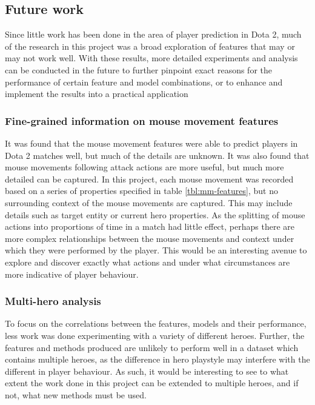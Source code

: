 \documentclass[Report.tex]{subfiles}
\begin{document}



\subsection{Future work}
Since little work has been done in the area of player prediction in Dota 2, much of the research in this project was a broad exploration of features that may or may not work well. With these results, more detailed experiments and analysis can be conducted in the future to further pinpoint exact reasons for the performance of certain feature and model combinations, or to enhance and implement the results into a practical application

\subsubsection{Fine-grained information on mouse movement features}
It was found that the mouse movement features were able to predict players in Dota 2 matches well, but much of the details are unknown. It was also found that mouse movements following attack actions are more useful, but much more detailed can be captured. In this project, each mouse movement was recorded based on a series of properties specified in table \ref{tbl:mm-features}, but no surrounding context of the mouse movements are captured. This may include details such as target entity or current hero properties. As the splitting of mouse actions into proportions of time in a match had little effect, perhaps there are more complex relationships between the mouse movements and context under which they were performed by the player. This would be an interesting avenue to explore and discover exactly what actions and under what circumstances are more indicative of player behaviour. 

\subsubsection{Multi-hero analysis}
To focus on the correlations between the features, models and their performance, less work was done experimenting with a variety of different heroes. Further, the features and methods produced are unlikely to perform well in a dataset which contains multiple heroes, as the difference in hero playstyle may interfere with the different in player behaviour. As such, it would be interesting to see to what extent the work done in this project can be extended to multiple heroes, and if not, what new methods must be used. 
\end{document}
